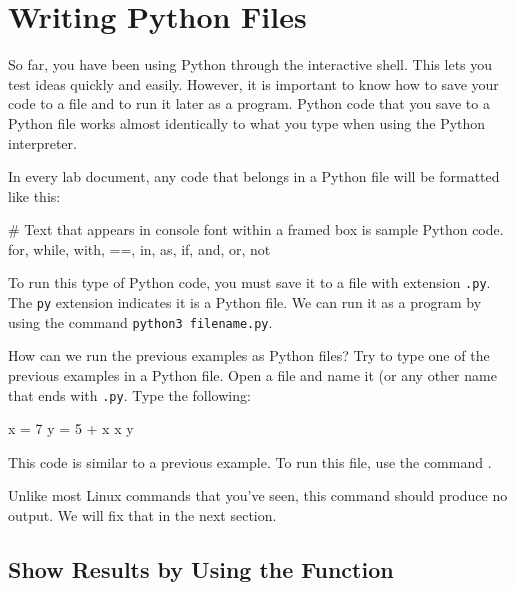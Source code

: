 \documentclass[11pt]{cselabheader}
\begin{document}
\section{Writing Python Files}

So far, you have been using Python through the interactive shell.
This lets you test ideas quickly and easily.
However, it is important to know how to save your code to a file
and to run it later as a program.
Python code that you save to a Python file works almost identically to what
you type when using the Python interpreter.

In every lab document, any code that belongs in a Python file
will be formatted like this:

\begin{python3code}
# Text that appears in console font within a framed box is sample Python code.
for, while, with, ==, in, as, if, and, or, not
\end{python3code}

To run this type of Python code, you must save it to a file with extension \texttt{.py}.
The \texttt{py} extension indicates it is a Python file.
We can run it as a program by using the command \texttt{python3 filename.py}.

How can we run the previous examples as Python files?  Try to type one
of the previous examples in a Python file.  Open a file and name it
 (or any other name that ends with
\texttt{.py}.  Type the following:

\begin{python3code}
x = 7
y = 5 + x
x
y
\end{python3code}

This code is similar to a previous example.
To run this file, use the command .


Unlike most Linux commands that you've seen, this command should
produce no output.
We will fix that in the next section.

\subsection{\texorpdfstring%
  {Show Results by Using the  Function}
  {Show Results by Using the print() Function}}
\end{document}
